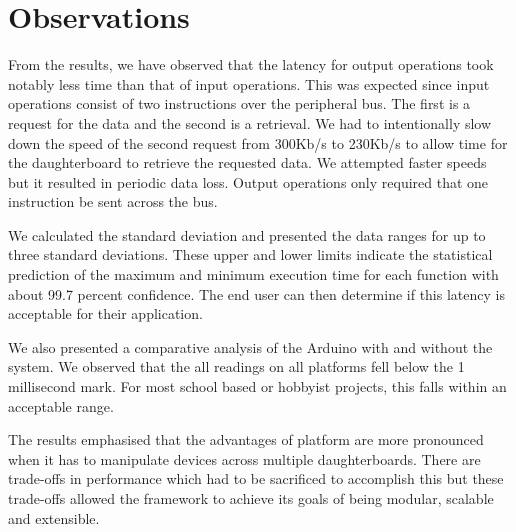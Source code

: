 

\section{Observations} %
\label{sec:Observations}

From the results, we have observed that the latency for output operations took notably less time than that of input operations. This was expected since input operations consist of two instructions over the peripheral bus. The first is a request for the data and the second is a retrieval. We had to intentionally slow down the speed of the second request from 300Kb/s to 230Kb/s to allow time for the daughterboard to retrieve the requested data. We attempted faster speeds but it resulted in periodic data loss. Output operations only required that one instruction be sent across the bus.

We calculated the standard deviation and presented the data ranges for up to three standard deviations. These upper and lower limits indicate the statistical prediction of the maximum and minimum execution time for each function with about 99.7 percent confidence. The end user can then determine if this latency is acceptable for their application.

We also presented a comparative analysis of the Arduino with and without the \xten system. We observed that the all readings on all platforms fell below the 1 millisecond mark. For most school based or hobbyist projects, this falls within an acceptable range.

The results emphasised that the advantages of \xten platform are more pronounced when it has to manipulate devices across multiple daughterboards. There are trade-offs in performance which had to be sacrificed to accomplish this but these trade-offs allowed the framework to achieve its goals of being modular, scalable and extensible.
